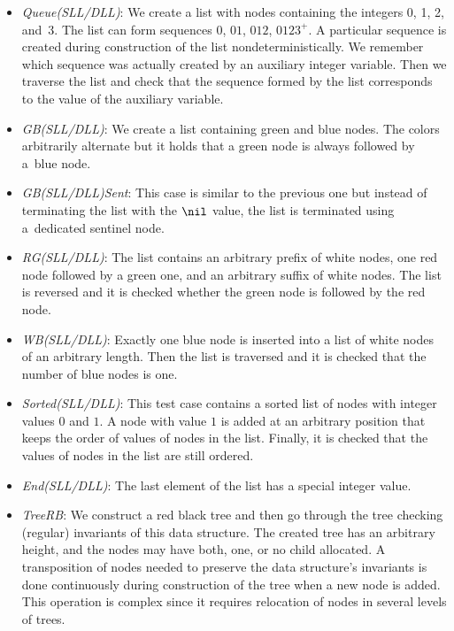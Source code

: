 {\begin{itemize}
    its address is assigned to the optional pointer. We verify the relation of
    integer values and optional pointers for all nodes of the list.
  \item \emph{Queue(SLL/DLL)}: We create a list with nodes containing the integers 0, 1, 2, and~3.
    The list can form sequences $0$, $01$, $012$, $0123^+$. A particular sequence is created
    during construction of the list nondeterministically. We remember which sequence was actually created
    by an auxiliary integer variable. Then we traverse the list and check that
    the sequence formed by the list corresponds to the value of the auxiliary variable.
  \item \emph{GB(SLL/DLL)}: We create a list containing green and blue nodes. The colors
    arbitrarily alternate but it holds that a green node is always followed by a~blue node.
  \item \emph{GB(SLL/DLL)Sent}: This case is similar to the previous one but instead of
    terminating the list with the $\nil$ value, the list is terminated using a~dedicated sentinel node.
  \item \emph{RG(SLL/DLL)}: The list contains an arbitrary prefix of white nodes,
    one red node followed by a green one, and an arbitrary suffix of white nodes.
    The list is reversed and it is checked whether the green node is followed by the red node.
  \item \emph{WB(SLL/DLL)}: Exactly one blue node is inserted into a list of white nodes
    of an arbitrary length. Then the list is traversed and it is checked that the number of blue
    nodes is one.
  \item \emph{Sorted(SLL/DLL)}: This test case contains a sorted list of nodes with integer values $0$ and $1$.
    A node with value $1$ is added at an arbitrary position that keeps the order of values of nodes in the list.
    Finally, it is checked that the values of nodes in the list are still ordered.
  \item \emph{End(SLL/DLL)}: The last element of the list has a special integer value.
  \item \emph{TreeRB}: We construct a red black tree and then go through the tree
    checking (regular) invariants of this data structure. The created tree has an arbitrary height,
    and the nodes may have both, one, or no child allocated. A transposition of nodes needed to
    preserve the data structure's invariants is done continuously during construction of the tree when a new node is added.
    This operation is complex since it requires relocation of nodes in several levels of trees.

\end{itemize}}
